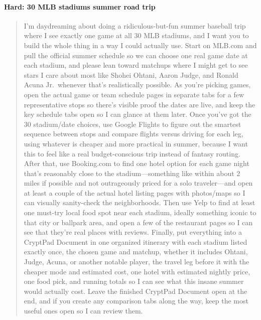 \documentclass{article}
\theoremstyle{plain}
\theoremstyle{definition}
\theoremstyle{remark}
\begin{document}
\paragraph{Hard: 30 MLB stadiums summer road trip}
\begin{quote}
\small
I'm daydreaming about doing a ridiculous-but-fun summer baseball trip where I see exactly one game at all 30 MLB stadiums, and I want you to build the whole thing in a way I could actually use. Start on MLB.com and pull the official summer schedule so we can choose one real game date at each stadium, and please lean toward matchups where I might get to see stars I care about most like Shohei Ohtani, Aaron Judge, and Ronald Acuna Jr.\ whenever that's realistically possible. As you're picking games, open the actual game or team schedule pages in separate tabs for a few representative stops so there's visible proof the dates are live, and keep the key schedule tabs open so I can glance at them later. Once you've got the 30 stadium/date choices, use Google Flights to figure out the smartest sequence between stops and compare flights versus driving for each leg, using whatever is cheaper and more practical in summer, because I want this to feel like a real budget-conscious trip instead of fantasy routing. After that, use Booking.com to find one hotel option for each game night that's reasonably close to the stadium---something like within about 2 miles if possible and not outrageously priced for a solo traveler---and open at least a couple of the actual hotel listing pages with photos/maps so I can visually sanity-check the neighborhoods. Then use Yelp to find at least one must-try local food spot near each stadium, ideally something iconic to that city or ballpark area, and open a few of the restaurant pages so I can see that they're real places with reviews. Finally, put everything into a CryptPad Document in one organized itinerary with each stadium listed exactly once, the chosen game and matchup, whether it includes Ohtani, Judge, Acuna, or another notable player, the travel leg before it with the cheaper mode and estimated cost, one hotel with estimated nightly price, one food pick, and running totals so I can see what this insane summer would actually cost. Leave the finished CryptPad Document open at the end, and if you create any comparison tabs along the way, keep the most useful ones open so I can review them.
\end{quote}
\end{document}
